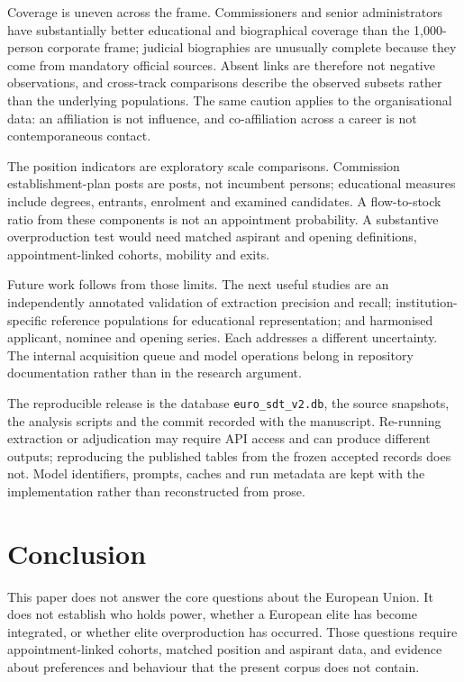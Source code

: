 \documentclass[11pt,a4paper]{article}
\begin{document}
Coverage is uneven across the frame. Commissioners and senior administrators have substantially better educational and biographical coverage than the 1{,}000-person corporate frame; judicial biographies are unusually complete because they come from mandatory official sources. Absent links are therefore not negative observations, and cross-track comparisons describe the observed subsets rather than the underlying populations. The same caution applies to the organisational data: an affiliation is not influence, and co-affiliation across a career is not contemporaneous contact.

The position indicators are exploratory scale comparisons. Commission establishment-plan posts are posts, not incumbent persons; educational measures include degrees, entrants, enrolment and examined candidates. A flow-to-stock ratio from these components is not an appointment probability. A substantive overproduction test would need matched aspirant and opening definitions, appointment-linked cohorts, mobility and exits.

Future work follows from those limits. The next useful studies are an independently annotated validation of extraction precision and recall; institution-specific reference populations for educational representation; and harmonised applicant, nominee and opening series. Each addresses a different uncertainty. The internal acquisition queue and model operations belong in repository documentation rather than in the research argument.

The reproducible release is the database \texttt{euro\_sdt\_v2.db}, the source snapshots, the analysis scripts and the commit recorded with the manuscript. Re-running extraction or adjudication may require API access and can produce different outputs; reproducing the published tables from the frozen accepted records does not. Model identifiers, prompts, caches and run metadata are kept with the implementation rather than reconstructed from prose.

\section{Conclusion}

This paper does not answer the core questions about the European Union. It does not establish who holds power, whether a European elite has become integrated, or whether elite overproduction has occurred. Those questions require appointment-linked cohorts, matched position and aspirant data, and evidence about preferences and behaviour that the present corpus does not contain.
\end{document}
